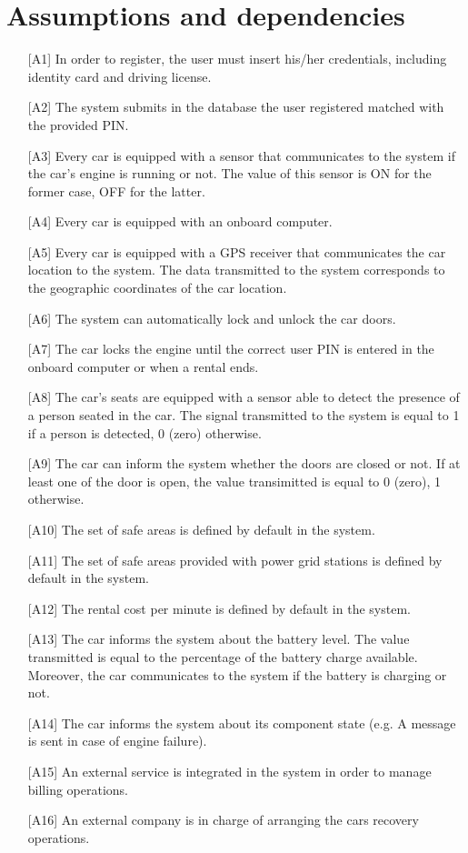 \section{Assumptions and dependencies}

\begin{itemize}
	\item[{[A1]}] In order to register, the user must insert his/her credentials, including identity card and driving license.
	\item[{[A2]}] The system submits in the database the user registered matched with the provided PIN.
	\item[{[A3]}] Every car is equipped with a sensor that communicates to the system if the car's engine is running or not. The value of this sensor is ON for the former case, OFF for the latter.
	\item[{[A4]}] Every car is equipped with an onboard computer.
	\item[{[A5]}] Every car is equipped with a GPS receiver that communicates the car location to the system. The data transmitted to the system corresponds to the geographic coordinates of the car location.
	\item[{[A6]}] The system can automatically lock and unlock the car doors.
	\item[{[A7]}] The car locks the engine until the correct user PIN is entered in the onboard computer or when a rental ends.
	\item[{[A8]}] The car's seats are equipped with a sensor able to detect the presence of a person seated in the car. The signal transmitted to the system is equal to 1 if a person is detected, 0 (zero) otherwise.
	\item[{[A9]}] The car can inform the system whether the doors are closed or not. If at least one of the door is open, the value transimitted is equal to 0 (zero), 1 otherwise.
	\item[{[A10]}] The set of safe areas is defined by default in the system.
	\item[{[A11]}] The set of safe areas provided with power grid stations is defined by default in the system.
	\item[{[A12]}] The rental cost per minute is defined by default in the system.
	\item[{[A13]}] The car informs the system about the battery level. The value transmitted is equal to the percentage of the battery charge available. Moreover, the car communicates to the system if the battery is charging or not.
	\item[{[A14]}] The car informs the system about its component state (e.g. A message is sent in case of engine failure).
	\item[{[A15]}] An external service is integrated in the system in order to manage billing operations.
	\item[{[A16]}] An external company is in charge of arranging the cars recovery operations.
\end{itemize}
